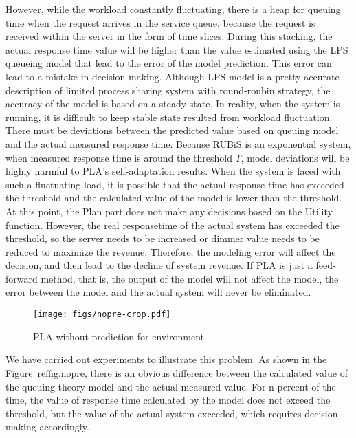 \documentclass[sigconf]{acmart}
\begin{document}
	
	However, while the workload constantly fluctuating, there is a heap for queuing time when the request arrives in the service queue, because the request is received within the server in the form of time slices. During this stacking, the actual response time value will be higher than the value estimated using the LPS queueing model that lead to the error of the model prediction. This error can lead to a mistake in decision making. Although LPS model is a pretty accurate description of limited process sharing system with round-roubin strategy, the accuracy of the model is based on a steady state. In reality, when the system is running, it is difficult to keep stable state resulted from workload fluctuation. There must be deviations between the predicted value based on queuing model and the actual measured response time. Because RUBiS is an exponential system, when measured response time is around the threshold $T$, model deviations will be highly harmful to PLA's self-adaptation results. When the system is faced with such a fluctuating load, it is possible that the actual response time has exceeded the threshold and the calculated value of the model is lower than the threshold. At this point, the Plan part does not make any decisions based on the Utility function. However, the real responsetime of the actual system has exceeded the threshold, so the server needs to be increased or dimmer value needs to be reduced to maximize the revenue. Therefore, the modeling error will affect the decision, and then lead to the decline of system revenue.
	If PLA is just a feed-forward method, that is, the output of the model will not affect the model, the error between the model and the actual system will never be eliminated.
	\begin{figure}[!htp]
		\centering
		\texttt{[image: figs/nopre-crop.pdf]}
		\caption{PLA without prediction for environment}
		\label{fig:nopre}
	\end{figure}
	
	We have carried out experiments to illustrate this problem. As shown in the Figure~ref{fig:nopre}, there is an obvious difference between the calculated value of the queuing theory model and the actual measured value. For n percent of the time, the value of response time calculated by the model does not exceed the threshold, but the value of the actual system exceeded, which requires decision making accordingly.
	
\end{document}
